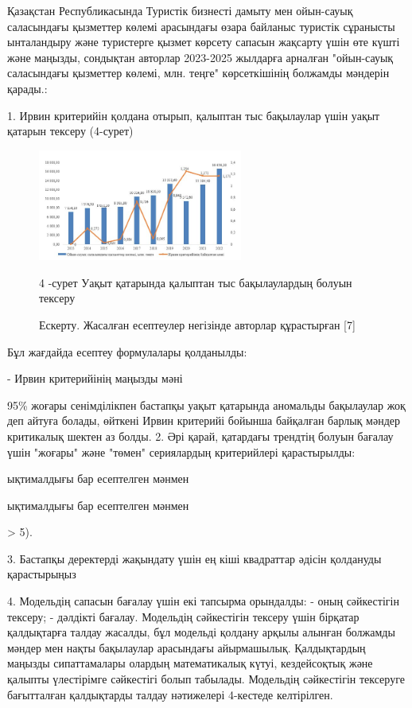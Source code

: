 Қазақстан Республикасында Туристік бизнесті дамыту мен ойын-сауық
саласындағы қызметтер көлемі арасындағы өзара байланыс туристік
сұранысты ынталандыру және туристерге қызмет көрсету сапасын жақсарту
үшін өте күшті және маңызды, сондықтан авторлар 2023-2025 жылдарға
арналған "ойын-сауық саласындағы қызметтер көлемі, млн. теңге"
көрсеткішінің болжамды мәндерін қарады.:

1. Ирвин критерийін қолдана отырып, қалыптан тыс бақылаулар үшін уақыт
қатарын тексеру (4-сурет)



\begin{figure}[H]
	\centering
	\includegraphics[width=0.6\textwidth]{media/ekon/image6.4}
	\caption*{4 -сурет Уақыт қатарында қалыптан тыс бақылаулардың болуын
  тексеру}
  \caption*{Ескерту. Жасалған есептеулер негізінде авторлар құрастырған {[}7{]}}
\end{figure}


Бұл жағдайда есептеу формулалары қолданылды:

- Ирвин критерийінің маңызды мәні

95\% жоғары сенімділікпен бастапқы уақыт қатарында аномальды бақылаулар
жоқ деп айтуға болады, өйткені Ирвин критерийі бойынша байқалған барлық
мәндер критикалық шектен аз болды. 2. Әрі қарай, қатардағы трендтің
болуын бағалау үшін "жоғары" және "төмен" сериялардың критерийлері
қарастырылды:

ықтималдығы бар есептелген мәнмен


ықтималдығы бар есептелген мәнмен

\textgreater{} 5).

3. Бастапқы деректерді жақындату үшін ең кіші квадраттар әдісін
қолдануды қарастырыңыз


4. Модельдің сапасын бағалау үшін екі тапсырма орындалды: - оның
сәйкестігін тексеру; - дәлдікті бағалау. Модельдің сәйкестігін тексеру
үшін бірқатар қалдықтарға талдау жасалды, бұл модельді қолдану арқылы
алынған болжамды мәндер мен нақты бақылаулар арасындағы айырмашылық.
Қалдықтардың маңызды сипаттамалары олардың математикалық күтуі,
кездейсоқтық және қалыпты үлестірімге сәйкестігі болып табылады.
Модельдің сәйкестігін тексеруге бағытталған қалдықтарды талдау
нәтижелері 4-кестеде келтірілген.

